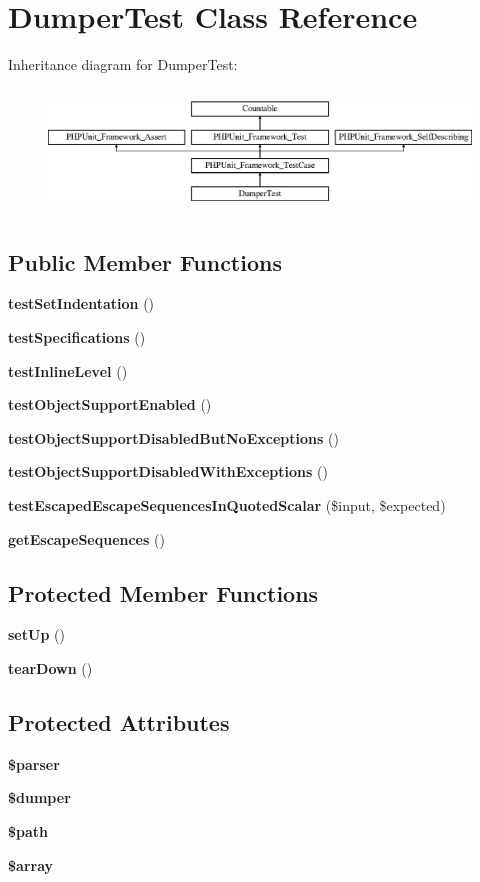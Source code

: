 \section{Dumper\+Test Class Reference}
\label{class_symfony_1_1_component_1_1_yaml_1_1_tests_1_1_dumper_test}
Inheritance diagram for Dumper\+Test\+:\begin{figure}[H]
\begin{center}
\leavevmode
\includegraphics[height=3.303835cm]{class_symfony_1_1_component_1_1_yaml_1_1_tests_1_1_dumper_test}
\end{center}
\end{figure}
\subsection*{Public Member Functions}
\begin{DoxyCompactItemize}
\item 
{\bf test\+Set\+Indentation} ()
\item 
{\bf test\+Specifications} ()
\item 
{\bf test\+Inline\+Level} ()
\item 
{\bf test\+Object\+Support\+Enabled} ()
\item 
{\bf test\+Object\+Support\+Disabled\+But\+No\+Exceptions} ()
\item 
{\bf test\+Object\+Support\+Disabled\+With\+Exceptions} ()
\item 
{\bf test\+Escaped\+Escape\+Sequences\+In\+Quoted\+Scalar} (\$input, \$expected)
\item 
{\bf get\+Escape\+Sequences} ()
\end{DoxyCompactItemize}
\subsection*{Protected Member Functions}
\begin{DoxyCompactItemize}
\item 
{\bf set\+Up} ()
\item 
{\bf tear\+Down} ()
\end{DoxyCompactItemize}
\subsection*{Protected Attributes}
\begin{DoxyCompactItemize}
\item 
{\bf \$parser}
\item 
{\bf \$dumper}
\item 
{\bf \$path}
\item 
{\bf \$array}
\end{DoxyCompactItemize}
